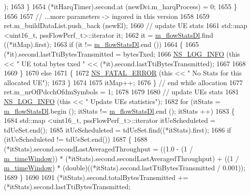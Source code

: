 \begin{DoxyCode}
      );
1653             \}
1654           (*itHarqTimer).second.at (newDci.m\_harqProcess) = 0;
1655         \}
1656 
1657       \textcolor{comment}{// ...more parameters -> ingored in this version}
1658 
1659       ret.m\_buildDataList.push\_back (newEl);
1660       \textcolor{comment}{// update UE stats}
1661       std::map <uint16\_t, pssFlowPerf\_t>::iterator it;
1662       it = \hyperlink{classns3_1_1PssFfMacScheduler_add144474dc7bd9d89b93ff14bc8d27c9}{m\_flowStatsDl}.find ((*itMap).first);
1663       \textcolor{keywordflow}{if} (it != \hyperlink{classns3_1_1PssFfMacScheduler_add144474dc7bd9d89b93ff14bc8d27c9}{m\_flowStatsDl}.end ())
1664         \{
1665           (*it).second.lastTtiBytesTransmitted = bytesTxed;
1666           \hyperlink{group__logging_gafbd73ee2cf9f26b319f49086d8e860fb}{NS\_LOG\_INFO} (\textcolor{keyword}{this} << \textcolor{stringliteral}{" UE total bytes txed "} << (*it).second.lastTtiBytesTransmitted);
1667 
1668 
1669         \}
1670       \textcolor{keywordflow}{else}
1671         \{
1672           \hyperlink{group__fatal_ga5131d5e3f75d7d4cbfd706ac456fdc85}{NS\_FATAL\_ERROR} (\textcolor{keyword}{this} << \textcolor{stringliteral}{" No Stats for this allocated UE"});
1673         \}
1674 
1675       itMap++;
1676     \} \textcolor{comment}{// end while allocation}
1677   ret.m\_nrOfPdcchOfdmSymbols = 1;   
1678 
1679 
1680   \textcolor{comment}{// update UEs stats}
1681   \hyperlink{group__logging_gafbd73ee2cf9f26b319f49086d8e860fb}{NS\_LOG\_INFO} (\textcolor{keyword}{this} << \textcolor{stringliteral}{" Update UEs statistics"});
1682   \textcolor{keywordflow}{for} (itStats = \hyperlink{classns3_1_1PssFfMacScheduler_add144474dc7bd9d89b93ff14bc8d27c9}{m\_flowStatsDl}.begin (); itStats != \hyperlink{classns3_1_1PssFfMacScheduler_add144474dc7bd9d89b93ff14bc8d27c9}{m\_flowStatsDl}.end (); itStats
      ++)
1683     \{ 
1684       std::map <uint16\_t, pssFlowPerf\_t>::iterator itUeScheduleted = tdUeSet.end();
1685       itUeScheduleted = tdUeSet.find((*itStats).first);
1686       \textcolor{keywordflow}{if} (itUeScheduleted != tdUeSet.end())
1687         \{
1688           (*itStats).second.secondLastAveragedThroughput = ((1.0 - (1 / 
      \hyperlink{classns3_1_1PssFfMacScheduler_aecdbf7e675d36f9ed48a35d8135fb08e}{m\_timeWindow})) * (*itStats).second.secondLastAveragedThroughput) + ((1 / 
      \hyperlink{classns3_1_1PssFfMacScheduler_aecdbf7e675d36f9ed48a35d8135fb08e}{m\_timeWindow}) * (double)((*itStats).second.lastTtiBytesTransmitted / 0.001));
1689         \}
1690 
1691       (*itStats).second.totalBytesTransmitted += (*itStats).second.lastTtiBytesTransmitted;

\end{DoxyCode}
